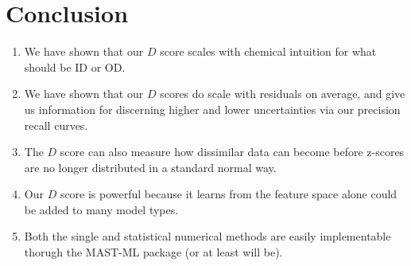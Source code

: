 \section{Conclusion}

\begin{enumerate}
    \item We have shown that our $D$ score scales with chemical intuition for what should be ID or OD.
    \item We have shown that our $D$ scores do scale with residuals on average, and give us information for discerning higher and lower uncertainties via our precision recall curves.
    \item The $D$ score can also measure how dissimilar data can become before z-scores are no longer distributed in a standard normal way.
    \item Our $D$ score is powerful because it learns from the feature space alone could be added to many model types.
    \item Both the single and statistical numerical methods are easily implementable thorugh the MAST-ML package (or at least will be).
\end{enumerate}